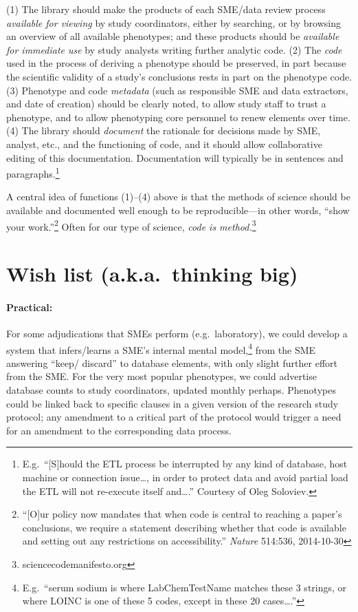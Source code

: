 \documentclass{tufte-handout}
\begin{document}
(1) The library should make the products of each SME/data
review process \emph{available for viewing} by study coordinators,
either by searching, or by browsing an overview of all available
phenotypes; and these products should be
\emph{available for immediate use} by study analysts writing further
analytic code. (2) The \emph{code} used in the process of deriving a
phenotype should be preserved, in part because the scientific validity of a study's
conclusions rests in part on the phenotype code. (3) Phenotype and
code \emph{metadata} (such as responsible SME and data extractors, and
date of creation) should be clearly noted, to allow study staff to
trust a phenotype, and to allow phenotyping core personnel to renew
elements over time. (4) The library should \emph{document} the
rationale for decisions made by SME, analyst, etc., and the
functioning of code, and it should allow
collaborative editing of this documentation. Documentation will
typically be in sentences and paragraphs.\footnote{E.g.\ ``[S]hould
  the ETL process be interrupted by any kind of database, host machine
  or connection issue\ldots{}, in order to protect data and avoid
  partial load the ETL will not re-execute itself and\ldots{}.'' Courtesy
  of Oleg Soloviev.}

\newpage

A central idea of functions (1)--(4) above is that the methods of
science should be available and documented well enough to be
reproducible---in other words, ``show your work.''\footnote{``[O]ur
  policy now mandates that when code is central to reaching a paper's
  conclusions, we require a statement describing whether that code is
  available and setting out any restrictions on accessibility.''
  \emph{Nature} 514:536, 2014-10-30} Often for our type of science,
\emph{code is method.}\footnote{sciencecodemanifesto.org} 

\section{Wish list (a.k.a.\ thinking big)}

\paragraph{Practical:}
For some adjudications that SMEs perform (e.g.\ laboratory), we could
develop a system that infers\slash learns a SME's internal mental
model,\footnote{E.g.\ ``serum sodium is where LabChemTestName matches
  these 3 strings, or where LOINC is one of these 5 codes, except in
  these 20 cases\ldots{}.''} from the SME answering ``keep\slash
discard'' to database elements, with only slight further effort from
the SME. For the very most popular phenotypes, we could advertise
database counts to study coordinators, updated monthly perhaps.
Phenotypes could be linked back to specific clauses in a given version
of the research study protocol; any amendment to a critical part of
the protocol would trigger a need for an amendment to the
corresponding data process.
\end{document}
